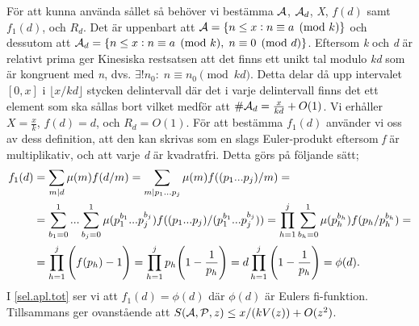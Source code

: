 För att kunna använda sållet så behöver vi bestämma \(\A\), \(\A_d\), \textit{X}, \(f(d)\) samt \(f_1(d)\), och \(R_d\). 
Det är uppenbart att \(\A = \{n\leq x: n \equiv a \pmod k\}\) och dessutom att \(\A_d = \{n \leq x: n \equiv a \pmod k,\; n \equiv 0 \pmod d\}\). 
Eftersom \textit{k} och \textit{d} är relativt prima ger Kinesiska restsatsen att det finns ett unikt tal modulo \textit{kd} som är kongruent med \textit{n}, dvs. \(\exists! n_0:\; n \equiv n_0 \pmod{kd}\). 
Detta delar då upp intervalet \([0, x]\) i \(\lfloor x/{kd}\rfloor\) stycken delintervall där det i varje delintervall finns det ett element som ska sållas bort vilket medför att \(\#\A_d = \frac{x}{kd} + O(1)\). 
Vi erhåller \(X = \frac{x}{k}\), \(f(d) = d\), och \(R_d = O(1)\). 
För att bestämma \(f_1(d)\) använder vi oss av dess definition, att den kan skrivas som en slags Euler-produkt eftersom \textit{f} är multiplikativ, och att varje \textit{d} är kvadratfri. 
Detta görs på följande sätt;
\begin{align}
    f_1(d) &= \sum_{m\divides d}\mu(m)f(d/m) = \sum_{m\divides p_1...p_j}\mu(m)f((p_1...p_j)/m) = \nonumber\\
    &=\sum_{b_1 = 0}^1...\sum_{b_j = 0}^1\mu(p_1^{b_1}...p_j^{b_j})f((p_1...p_j)/(p_1^{b_1}...p_j^{b_j})) = \prod_{h = 1}^j\sum_{b_h = 0}^1\mu(p_h^{b_h})f(p_h/p_h^{b_h}) = \nonumber\\
    &= \prod_{h = 1}^j\Bigg(f(p_h) - 1\Bigg) = \prod_{h = 1}^j p_h\Bigg(1 - \frac{1}{p_h}\Bigg) = d\prod_{h = 1}^j \Bigg(1 - \frac{1}{p_h}\Bigg) = \phi(d).\label{sel.apl.tot}
\end{align}
I \eqref{sel.apl.tot} ser vi att \(f_1(d) = \phi(d)\) där \(\phi(d)\) är Eulers fi-funktion. 
Tillsammans ger ovanstående att \(\S{A}{P}{z} \leq x/(kV(z)) + O(z^2)\). 

